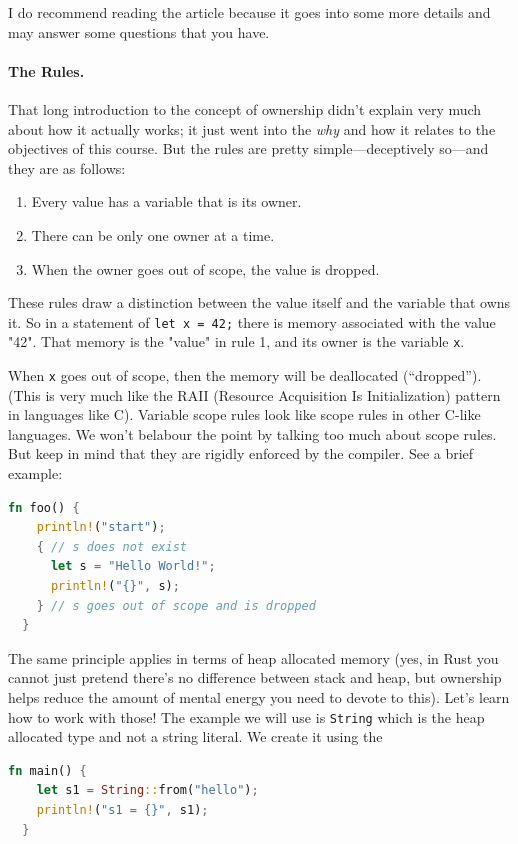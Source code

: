 \documentclass[a4paper]{report}
\newcommand{\CPP}{C\nolinebreak\hspace{-.05em}\raisebox{.4ex}{\tiny\bf +}\nolinebreak\hspace{-.10em}\raisebox{.4ex}{\tiny\bf +}}
\def\CPP{{C\nolinebreak[4]\hspace{-.05em}\raisebox{.4ex}{\tiny\bf ++}}}
\begin{document}
I do recommend reading the article because it goes into some more details and may answer some questions that you have. 

\paragraph{The Rules.}
That long introduction to the concept of ownership didn't explain very much about how it actually works; it just went into the \textit{why} and how it relates to the objectives of this course. But the rules are pretty simple---deceptively so---and they are as follows:

\begin{enumerate}
	\item Every value has a variable that is its owner.
	\item There can be only one owner at a time.
	\item When the owner goes out of scope, the value is dropped.
\end{enumerate}

These rules draw a distinction between the value itself and the variable that owns it. So in a statement of \texttt{let x = 42;} there is memory associated with the value "42". That memory is the "value" in rule 1, and its owner is the variable \texttt{x}.

When \texttt{x} goes out of scope, then the memory will be deallocated (``dropped''). (This is very much like the RAII (Resource Acquisition Is Initialization) pattern in languages like \CPP). Variable scope rules look like scope rules in other C-like languages. We won't belabour the point by talking too much about scope rules. But keep in mind that they are rigidly enforced by the compiler. See a brief example:
\begin{lstlisting}[language=Rust]
  fn foo() {
    println!("start");
    { // s does not exist
      let s = "Hello World!";
      println!("{}", s);
    } // s goes out of scope and is dropped
  }
\end{lstlisting}

The same principle applies in terms of heap allocated memory (yes, in Rust you cannot just pretend there's no difference between stack and heap, but ownership helps reduce the amount of mental energy you need to devote to this). Let's learn how to work with those! The example we will use is \texttt{String} which is the heap allocated type and not a string literal. We create it using the 
\begin{lstlisting}[language=Rust]
  fn main() {
    let s1 = String::from("hello");
    println!("s1 = {}", s1);
  }
\end{lstlisting}
\end{document}
